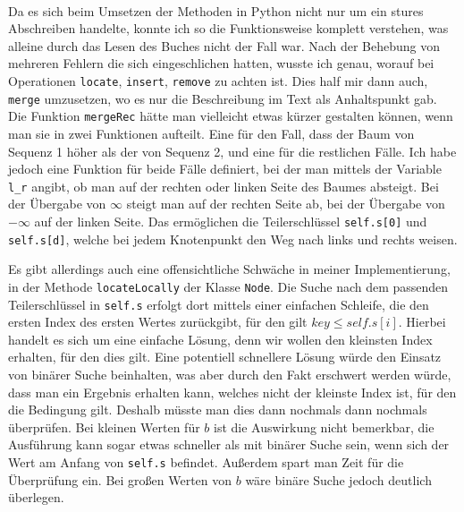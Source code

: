 \\
Da es sich beim Umsetzen der Methoden in Python nicht nur um ein stures Abschreiben handelte, konnte ich so die Funktionsweise komplett verstehen, was alleine durch das Lesen des Buches nicht der Fall war. Nach der Behebung von mehreren Fehlern die sich eingeschlichen hatten, wusste ich genau, worauf bei Operationen \texttt{locate}, \texttt{insert}, \texttt{remove} zu achten ist. Dies half mir dann auch, \texttt{merge} umzusetzen, wo es nur die Beschreibung im Text als Anhaltspunkt gab. Die Funktion \texttt{mergeRec} hätte man vielleicht etwas kürzer gestalten können, wenn man sie in zwei Funktionen aufteilt. Eine für den Fall, dass der Baum von Sequenz 1 höher als der von Sequenz 2, und eine für die restlichen Fälle. Ich habe jedoch eine Funktion für beide Fälle definiert, bei der man mittels der Variable \texttt{l\_r} angibt, ob man auf der rechten oder linken Seite des Baumes absteigt. Bei der Übergabe von $\infty$ steigt man auf der rechten Seite ab, bei der Übergabe von $-\infty$ auf der linken Seite. Das ermöglichen die Teilerschlüssel \texttt{self.s[0]} und \texttt{self.s[d]}, welche bei jedem Knotenpunkt den Weg nach links und rechts weisen.
\par
Es gibt allerdings auch eine offensichtliche Schwäche in meiner Implementierung, in der Methode \texttt{locateLocally} der Klasse \texttt{Node}. Die Suche nach dem passenden Teilerschlüssel in \texttt{self.s} erfolgt dort mittels einer einfachen Schleife, die den ersten Index des ersten Wertes zurückgibt, für den gilt \texttt{$key \leq self.s[i]$}. Hierbei handelt es sich um eine einfache Lösung, denn wir wollen den kleinsten Index erhalten, für den dies gilt. Eine potentiell schnellere Lösung würde den Einsatz von binärer Suche beinhalten, was aber durch den Fakt erschwert werden würde, dass man ein Ergebnis erhalten kann, welches nicht der kleinste Index ist, für den die Bedingung gilt. Deshalb müsste man dies dann nochmals dann nochmals überprüfen. Bei kleinen Werten für $b$ ist die Auswirkung nicht bemerkbar, die Ausführung kann sogar etwas schneller als mit binärer Suche sein, wenn sich der Wert am Anfang von \texttt{self.s} befindet. Außerdem spart man Zeit für die Überprüfung ein. Bei großen Werten von $b$ wäre binäre Suche jedoch deutlich überlegen.
\par
